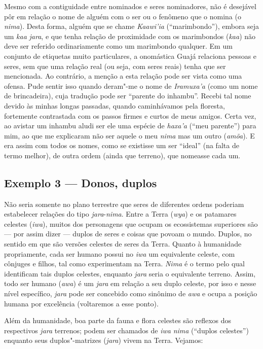 Mesmo com a contiguidade entre nominados e seres nominadores, não é
desejável pôr em relação o nome de alguém com o ser ou o fenômeno que o
nomina (o \emph{nima}). Desta forma, alguém que se chame \emph{Kaawi'ia}
(``marimbondo''), embora seja um \emph{kaa} \emph{jara}, e que tenha
relação de proximidade com os marimbondos (\emph{kaa}) não deve ser
referido ordinariamente como um marimbondo qualquer. Em um conjunto de
etiquetas muito particulares, a onomástica Guajá relaciona pessoas e
seres, sem que uma relação real (ou seja, com seres reais) tenha que ser
mencionada. Ao contrário, a menção a esta relação pode ser vista como
uma ofensa. Pude sentir isso quando deram"-me o nome de \emph{Iramuxa'a}
(como um nome de brincadeira), cuja tradução pode ser ``parente do
inhambu''. Recebi tal nome devido às minhas longas passadas, quando
caminhávamos pela floresta, fortemente contrastada com os passos firmes
e curtos de meus amigos. Certa vez, ao avistar um inhambu aludi ser ele
uma espécie de \emph{haxa'a} (``meu parente'') para mim, ao que me
explicaram não ser aquele o meu \emph{nima} mas um outro (\emph{amõa}).
E era assim com todos os nomes, como se existisse um ser ``ideal'' (na
falta de termo melhor), de outra ordem (ainda que terreno), que nomeasse
cada um.

\subsection{Exemplo 3 --- Donos, duplos}

\forceindent
Não seria somente no plano terrestre que seres de diferentes ordens
poderiam estabelecer relações do tipo \emph{jara}-\emph{nima}. Entre a
Terra (\emph{wya}) e os patamares celestes (\emph{iwa}), muitos dos
personagens que ocupam os ecossistemas superiores são --- por assim dizer
--- duplos de seres e coisas que povoam o mundo. Duplos, no sentido em que
são versões celestes de seres da Terra. Quanto à humanidade
propriamente, cada ser humano possui no \emph{iwa} um equivalente
celeste, com cônjuges e filhos, tal como experimentam na Terra.
\emph{Nima} é o termo pelo qual identificam tais duplos celestes,
enquanto \emph{jara} seria o equivalente terreno. Assim, todo ser humano
(\emph{awa}) é um \emph{jara} em relação a seu duplo celeste, por isso e
nesse nível específico, \emph{jara} pode ser concebido como sinônimo de
\emph{awa} e ocupa a posição humana por excelência (voltaremos a esse
ponto).

Além da humanidade, boa parte da fauna e flora celestes são reflexos dos
respectivos \emph{jara} terrenos; podem ser chamados de \emph{iwa}
\emph{nima} (``duplos celestes'') enquanto seus duplos"-matrizes
(\emph{jara}) vivem na Terra. Vejamos:

